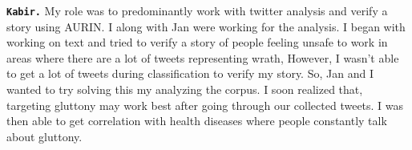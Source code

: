 \textbf{\texttt{Kabir.} }
My role was to predominantly work with twitter analysis and verify a story using AURIN. I along with Jan were working for the analysis. I began with working on text and tried to verify a story of people feeling unsafe to work in areas where there are a lot of tweets representing wrath, However, I wasn't able to get a lot of tweets during classification to verify my story. So, Jan and I wanted to try solving this my analyzing the corpus. I soon realized that, targeting gluttony may work best after going through our collected tweets. I was then able to get correlation with health diseases where people constantly talk about gluttony.